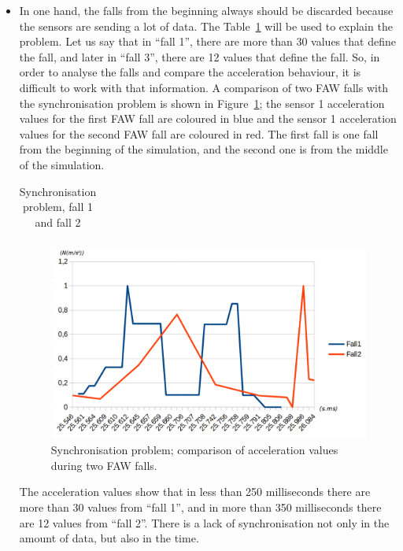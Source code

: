 \documentclass[review]{elsarticle}
\begin{document}
\begin{itemize}
 \item In one hand, the falls from the beginning always should be discarded because the sensors are 
 sending a lot of data. The Table~\ref{tabla:Synchro} will be used to explain the problem. Let us say 
 that in ``fall 1'', there are more than 30 values that define the fall, and later in ``fall 3'', there are 
 12 values that define the fall. So, in order to analyse the falls and compare the acceleration behaviour, it is 
 difficult to work with that information. A comparison of two FAW falls with the synchronisation problem is shown
 in Figure~\ref{fig:synchronisation1}; the sensor 1 acceleration values for the first FAW fall are coloured in blue and the
 sensor 1 acceleration values for the second FAW fall are coloured in red. The first fall is one fall from the beginning
 of the simulation, and the second one is from the middle of the simulation.
 
 \begin{table}[!ht]
 \centering
 \begin{tabular}{*{5}{r}}
   
 \end{tabular}
 \caption{Synchronisation problem, fall 1 and fall 2}%
 \label{tabla:Synchro}
 \end{table}
 
 \begin{figure}[!ht]
  \centering
  \includegraphics[scale=0.2]{img/synchronisation1.png}
  \caption[Comparison acceleration during two FAW falls]{Synchronisation problem; comparison of acceleration values during two FAW falls.}
  \label{fig:synchronisation1}
 \end{figure}
 
 The acceleration values show that in less than 250 milliseconds there are more than 30 values from ``fall 1'', and
 in more than 350 milliseconds there are 12 values from ``fall 2''. There is a lack of synchronisation not only in
 the amount of data, but also in the time.
 

\end{itemize}
\end{document}
